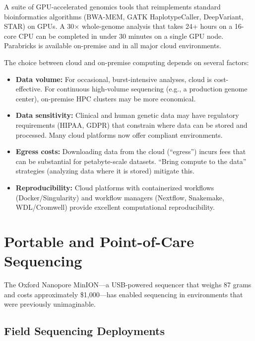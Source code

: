 \begin{description}[style=nextline, itemsep=2pt]
  \item[NVIDIA Clara Parabricks] A suite of GPU-accelerated genomics tools that reimplements standard bioinformatics algorithms (BWA-MEM, GATK HaplotypeCaller, DeepVariant, STAR) on GPUs. A 30$\times$ whole-genome analysis that takes 24+ hours on a 16-core CPU can be completed in under 30 minutes on a single GPU node. Parabricks is available on-premise and in all major cloud environments.
\end{description}

\begin{tipbox}[title={Choosing Between Cloud and On-Premise}]
The choice between cloud and on-premise computing depends on several factors:
\begin{itemize}[itemsep=2pt]
  \item \textbf{Data volume:} For occasional, burst-intensive analyses, cloud is cost-effective. For continuous high-volume sequencing (e.g., a production genome center), on-premise HPC clusters may be more economical.
  \item \textbf{Data sensitivity:} Clinical and human genetic data may have regulatory requirements (HIPAA, GDPR) that constrain where data can be stored and processed. Many cloud platforms now offer compliant environments.
  \item \textbf{Egress costs:} Downloading data from the cloud (``egress'') incurs fees that can be substantial for petabyte-scale datasets. ``Bring compute to the data'' strategies (analyzing data where it is stored) mitigate this.
  \item \textbf{Reproducibility:} Cloud platforms with containerized workflows (Docker/Singularity) and workflow managers (Nextflow, Snakemake, WDL/Cromwell) provide excellent computational reproducibility.
\end{itemize}
\end{tipbox}


\section{Portable and Point-of-Care Sequencing}
\label{sec:emerging:portable}

The Oxford Nanopore MinION---a USB-powered sequencer that weighs 87 grams and costs approximately \$1,000---has enabled sequencing in environments that were previously unimaginable.

\subsection{Field Sequencing Deployments}
\label{subsec:emerging:field}

